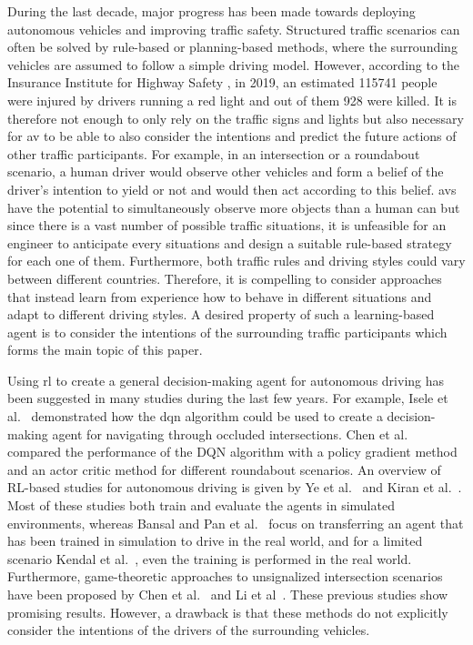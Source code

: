 	During the last decade, major progress has been made towards deploying autonomous vehicles and improving traffic safety. 
	Structured traffic scenarios can often be solved by rule-based or planning-based methods, where the surrounding vehicles are assumed to follow a simple driving model. However, according to the Insurance Institute for Highway Safety \cite{IIHS2019}, in 2019, an estimated \num{115741} people were injured by drivers running a red light and out of them \num{928} were killed. It is therefore not enough to only rely on the traffic signs and lights but also necessary for \gls{av} to be able to also consider the intentions and predict the future actions of other traffic participants. 
	For example, in an intersection or a roundabout scenario, a human driver would observe other vehicles and form a belief of the driver's intention to yield or not and would then act according to this belief. \gls{av}s have the potential to simultaneously observe more objects than a human can but since there is a vast number of possible traffic situations, it is unfeasible for an engineer to anticipate every situations and design a suitable rule-based strategy for each one of them. Furthermore, both traffic rules and driving styles could vary between different countries. Therefore, it is compelling to consider approaches that instead learn from experience how to behave in different situations and adapt to different driving styles. A desired property of such a learning-based agent is to consider the intentions of the surrounding traffic participants which forms the main topic of this paper.

	Using \gls{rl} to create a general decision-making agent for autonomous driving has been suggested in many studies during the last few years. For example, Isele et al.~\cite{Isele2018} \citeauthor{Isele2018} demonstrated how the \gls{dqn} algorithm could be used to create a decision-making agent for navigating through occluded intersections. Chen et al.~\cite{chen2019} compared the performance of the DQN algorithm with a policy gradient method and an actor critic method for different roundabout scenarios. 
	 An overview of RL-based studies for autonomous driving is given by Ye et al.~\cite{Ye2021} and Kiran et al.~\cite{kiran2021}.
	 Most of these studies both train and evaluate the agents in simulated environments, whereas Bansal and Pan et al.~\cite{Bansal2018,Pan2017} focus on transferring an agent that has been trained in simulation to drive in the real world, and for a limited scenario Kendal et al.~\cite{Kendall2019}, even the training is performed in the real world.
	 Furthermore, game-theoretic approaches to unsignalized intersection scenarios have been proposed by Chen et al.~\cite{chen2020} and Li et al~\cite{li2021}.
	 These previous studies show promising results. 
	 However, a drawback is that these methods do not explicitly consider the intentions of the drivers of the surrounding vehicles. 
	


